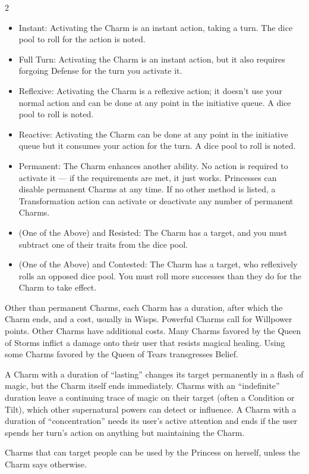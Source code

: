 \begin{multicols}{2}
\begin{itemize}
\item Instant: Activating the Charm is an instant action, taking a turn. The dice pool to roll for the action is noted.
\item Full Turn: Activating the Charm is an instant action, but it also requires forgoing Defense for the turn you activate it.
\item Reflexive: Activating the Charm is a reflexive action; it doesn't use your normal action and can be done at any point in the initiative queue. A dice pool to roll is noted.
\item Reactive: Activating the Charm can be done at any point in the initiative queue but it consumes your action for the turn. A dice pool to roll is noted.
\item Permanent: The Charm enhances another ability. No action is required to activate it — if the requirements are met, it just works. Princesses can disable permanent Charms at any time. If no other method is listed, a Transformation action can activate or deactivate any number of permanent Charms. 
\item (One of the Above) and Resisted: The Charm has a target, and you must subtract one of their traits from the dice pool.
\item (One of the Above) and Contested: The Charm has a target, who reflexively rolls an opposed dice pool. You must roll more successes than they do for the Charm to take effect.
\end{itemize}
    
Other than permanent Charms, each Charm has a duration, after which the Charm ends, and a cost, usually in Wisps. Powerful Charms call for Willpower points. Other Charms have additional costs. Many Charms favored by the Queen of Storms inflict a damage onto their user that resists magical healing. Using some Charms favored by the Queen of Tears transgresses Belief. 

A Charm with a duration of “lasting” changes its target permanently in a flash of magic, but the Charm itself ends immediately. Charms with an “indefinite” duration leave a continuing trace of magic on their target (often a Condition or Tilt), which other supernatural powers can detect or influence. A Charm with a duration of “concentration” needs its user’s active attention and ends if the user spends her turn's action on anything but maintaining the Charm.

Charms that can target people can be used by the Princess on herself, unless the Charm says otherwise. 


\end{multicols}
